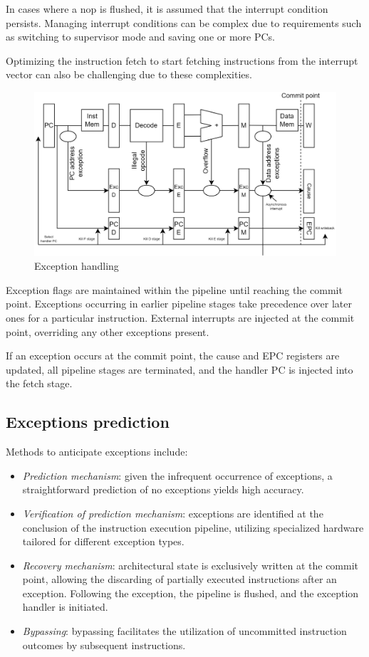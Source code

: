 In cases where a nop is flushed, it is assumed that the interrupt condition persists. 
Managing interrupt conditions can be complex due to requirements such as switching to supervisor mode and saving one or more PCs.

Optimizing the instruction fetch to start fetching instructions from the interrupt vector can also be challenging due to these complexities.
\begin{figure}[H]
    \centering
    \includegraphics[width=0.75\linewidth]{images/5s2.png}
    \caption{Exception handling}
\end{figure}
Exception flags are maintained within the pipeline until reaching the commit point. 
Exceptions occurring in earlier pipeline stages take precedence over later ones for a particular instruction. 
External interrupts are injected at the commit point, overriding any other exceptions present.

If an exception occurs at the commit point, the cause and EPC registers are updated, all pipeline stages are terminated, and the handler PC is injected into the fetch stage.

\subsection{Exceptions prediction}
Methods to anticipate exceptions include:
\begin{itemize}
    \item \textit{Prediction mechanism}: given the infrequent occurrence of exceptions, a straightforward prediction of no exceptions yields high accuracy.
    \item \textit{Verification of prediction mechanism}: exceptions are identified at the conclusion of the instruction execution pipeline, utilizing specialized hardware tailored for different exception types.
    \item \textit{Recovery mechanism}: architectural state is exclusively written at the commit point, allowing the discarding of partially executed instructions after an exception.
        Following the exception, the pipeline is flushed, and the exception handler is initiated.
    \item \textit{Bypassing}: bypassing facilitates the utilization of uncommitted instruction outcomes by subsequent instructions.
\end{itemize}